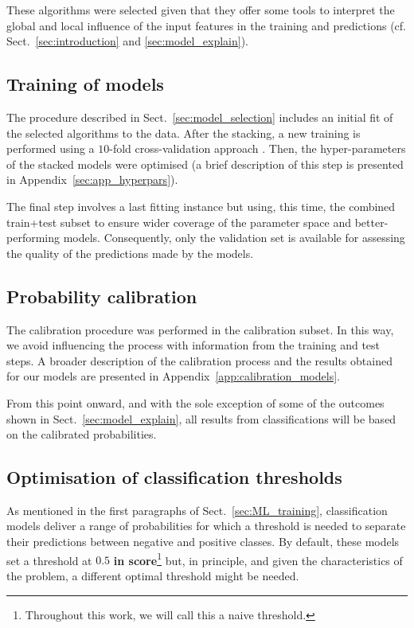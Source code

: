 \documentclass{aa}
\begin{document}
These algorithms were selected given that they offer some tools to interpret the global and local influence of the input features in the training and predictions (cf. Sect.~\ref{sec:introduction} and \ref{sec:model_explain}).

\subsection{Training of models}\label{sec:models_training}

The procedure described in Sect.~\ref{sec:model_selection} includes an initial fit of the selected algorithms to the data. After the stacking, a new training is performed using a $10$-fold cross-validation approach \citep[e.g.][]{https://doi.org/10.1111/j.2517-6161.1974.tb00994.x, doi:10.1080/00401706.1974.10489157}. Then, the hyper-parameters of the stacked models were optimised (a brief description of this step is presented in Appendix~\ref{sec:app_hyperpars}).

The final step involves a last fitting instance but using, this time, the combined train+test subset to ensure wider coverage of the parameter space and better-performing models. Consequently, only the validation set is available for assessing the quality of the predictions made by the models.

\subsection{Probability calibration}\label{sec:prob_calibration}

The calibration procedure was performed in the calibration subset. In this way, we avoid influencing the process with information from the training and test steps. A broader description of the calibration process and the results obtained for our models are presented in Appendix~\ref{app:calibration_models}.

From this point onward, and with the sole exception of some of the outcomes shown in Sect.~\ref{sec:model_explain}, all results from classifications will be based on the calibrated probabilities.

\subsection{Optimisation of classification thresholds}\label{sec:threshold_opt}

As mentioned in the first paragraphs of Sect.~\ref{sec:ML_training}, classification models deliver a range of probabilities for which a threshold is needed to separate their predictions between negative and positive classes. By default, these models set a threshold at $0.5$ \textbf{in score}\footnote{Throughout this work, we will call this a naive threshold.} but, in principle, and given the characteristics of the problem, a different optimal threshold might be needed.
\end{document}
